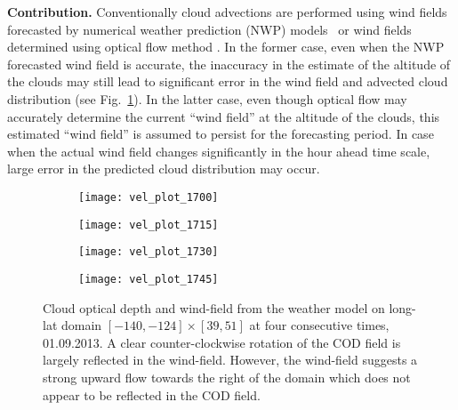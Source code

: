 \documentclass[onecolumn, 12pt, conference]{ieeeconf}
\begin{document}
\textbf{Contribution.}  Conventionally cloud advections are performed using wind fields forecasted by numerical weather prediction (NWP) models~\cite{Miller2012} or wind fields determined using optical flow method \cite{Chow_SolarEnergy_2015}. In the former case, even when the NWP forecasted wind field is accurate, the inaccuracy in the estimate of the altitude of the clouds may still lead to significant error in the wind field and advected cloud distribution (see Fig.~\ref{fig:wind}). In the latter case, even though optical flow may accurately determine the current ``wind field'' at the altitude of the clouds, this  estimated ``wind field'' is assumed to persist for the forecasting period. In case when the actual wind field changes significantly in the hour ahead time scale, large error in the predicted cloud distribution may occur.
\begin{figure}
        \centering
        \begin{subfigure}{}
                \texttt{[image: vel\_plot\_1700]}
        \end{subfigure}%
        \hspace{-3pt}%
        \begin{subfigure}{}
                \texttt{[image: vel\_plot\_1715]}
        \end{subfigure}%
	\vspace{-3pt}
        \begin{subfigure}{}
                \texttt{[image: vel\_plot\_1730]}
        \end{subfigure}%
        \hspace{-6pt}
	 \begin{subfigure}{}
          \texttt{[image: vel\_plot\_1745]}
        \end{subfigure}%
	\caption{Cloud optical depth and wind-field from the weather model on long-lat domain $[-140, -124]\times[39,51]$ at four consecutive times, 01.09.2013. A clear counter-clockwise rotation of the COD field is largely reflected in the wind-field. However, the wind-field suggests a strong upward flow towards the right of the domain which does not appear to be reflected in the COD field.}
\label{fig:wind}
\end{figure}
\end{document}
